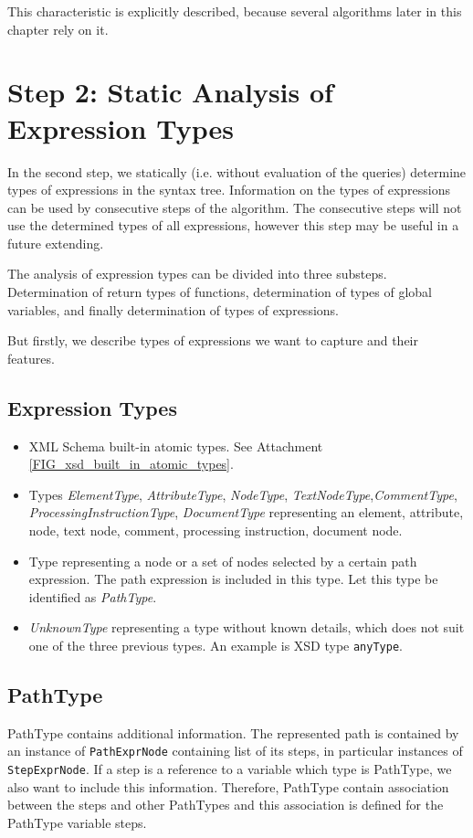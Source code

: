 This characteristic is explicitly described, because several algorithms later in this chapter rely on it.


\section{Step 2: Static Analysis of Expression Types}
In the second step, we statically (i.e. without evaluation of the queries) determine types of expressions in the syntax tree. Information on the types of expressions can be used by consecutive steps of the algorithm. The consecutive steps will not use the determined types of all expressions, however this step may be useful in a future extending.

The analysis of expression types can be divided into three substeps. Determination of return types of functions, determination of types of global variables, and finally determination of types of expressions.

But firstly, we describe types of expressions we want to capture and their features.

\subsection{Expression Types}
\begin{itemize}
\item XML Schema built-in atomic types. See Attachment \ref{FIG_xsd_built_in_atomic_types}.
\item Types \emph{ElementType}, \emph{AttributeType}, \emph{NodeType}, \emph{TextNodeType},\linebreak \emph{CommentType}, \emph{ProcessingInstructionType}, \emph{DocumentType} representing an element, attribute, node, text node, comment, processing instruction, document node.
\item Type representing a node or a set of nodes selected by a certain path expression. The path expression is included in this type. Let this type be identified as \emph{PathType}.
\item \emph{UnknownType} representing a type without known details, which does not suit one of the three previous types. An example is XSD type \texttt{anyType}.
\end{itemize}

\subsection{PathType}
PathType contains additional information. The represented path is contained by an instance of \texttt{PathExprNode} containing list of its steps, in particular instances of \texttt{StepExprNode}. If a step is a reference to a variable which type is PathType, we also want to include this information. Therefore, PathType contain association between the steps and other PathTypes and this association is defined for the PathType variable steps.

